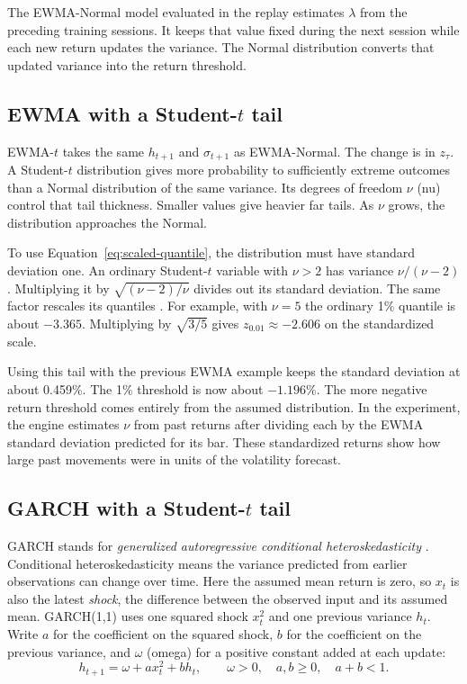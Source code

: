 \documentclass[
	12pt,				%
	openright,			%
	twoside,			%
	a4paper,
	chapter=TITLE,
	english				%
	]{abntex2}
\begin{document}
The EWMA-Normal model evaluated in the replay estimates $\lambda$ from the preceding training sessions. It keeps that value fixed during the next session while each new return updates the variance. The Normal distribution converts that updated variance into the return threshold.

\subsection{EWMA with a Student-\texorpdfstring{$t$}{t} tail}

EWMA-$t$ takes the same $h_{t+1}$ and $\sigma_{t+1}$ as EWMA-Normal. The change is in $z_\tau$. A Student-$t$ distribution gives more probability to sufficiently extreme outcomes than a Normal distribution of the same variance. Its degrees of freedom $\nu$ (nu) control that tail thickness. Smaller values give heavier far tails. As $\nu$ grows, the distribution approaches the Normal.

To use Equation~\ref{eq:scaled-quantile}, the distribution must have standard deviation one. An ordinary Student-$t$ variable with $\nu>2$ has variance $\nu/(\nu-2)$. Multiplying it by $\sqrt{(\nu-2)/\nu}$ divides out its standard deviation. The same factor rescales its quantiles \cite{bollerslev-1987}. For example, with $\nu=5$ the ordinary 1\% quantile is about $-3.365$. Multiplying by $\sqrt{3/5}$ gives $z_{0.01}\approx-2.606$ on the standardized scale.

Using this tail with the previous EWMA example keeps the standard deviation at about 0.459\%. The 1\% threshold is now about $-1.196\%$. The more negative return threshold comes entirely from the assumed distribution. In the experiment, the engine estimates $\nu$ from past returns after dividing each by the EWMA standard deviation predicted for its bar. These standardized returns show how large past movements were in units of the volatility forecast.

\subsection{GARCH with a Student-\texorpdfstring{$t$}{t} tail}

GARCH stands for \emph{generalized autoregressive conditional heteroskedasticity} \cite{bollerslev-1986}. Conditional heteroskedasticity means the variance predicted from earlier observations can change over time. Here the assumed mean return is zero, so $x_t$ is also the latest \emph{shock}, the difference between the observed input and its assumed mean. GARCH(1,1) uses one squared shock $x_t^2$ and one previous variance $h_t$. Write $a$ for the coefficient on the squared shock, $b$ for the coefficient on the previous variance, and $\omega$ (omega) for a positive constant added at each update:
\begin{equation}
  h_{t+1}=\omega+a x_t^2+b h_t,\qquad
  \omega>0,\quad a,b\geq 0,\quad a+b<1.
  \label{eq:garch}
\end{equation}
\end{document}
